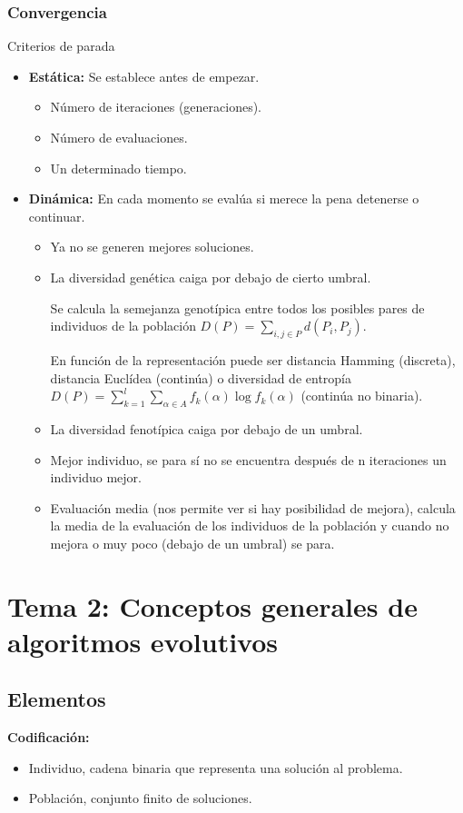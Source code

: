 \documentclass[12pt, twoside, openright]{report} %
\begin{document}
\subsection{Convergencia}
Criterios de parada
\begin{itemize}
	\item \textbf{Estática:} Se establece antes de empezar.
	      \begin{itemize}
		      \item Número de iteraciones (generaciones).
		      \item Número de evaluaciones.
		      \item Un determinado tiempo.
	      \end{itemize}
	\item \textbf{Dinámica:} En cada momento se evalúa si merece la pena detenerse o continuar.
	      \begin{itemize}
		      \item Ya no se generen mejores soluciones.
		      \item La diversidad genética caiga por debajo de cierto umbral.

		            Se calcula la semejanza genotípica entre todos los posibles pares de individuos de la población $D(P)=\sum_{i,j\in P} d(P_i, P_j)$.

		            En función de la representación puede ser distancia Hamming (discreta), distancia Euclídea (continúa) o diversidad de entropía $D(P)=\sum_{k=1}^l\sum_{\alpha \in A} f_k(\alpha)\log f_k(\alpha)$ (continúa no binaria).
		      \item La diversidad fenotípica caiga por debajo de un umbral.
		      \item Mejor individuo, se para sí no se encuentra después de n iteraciones un individuo mejor.
		      \item Evaluación media (nos permite ver si hay posibilidad de mejora), calcula la media de la evaluación de los individuos de la población y cuando no mejora o muy poco (debajo de un umbral) se para.
	      \end{itemize}
\end{itemize}

\chapter{Tema 2: Conceptos generales de algoritmos evolutivos}
\section{Elementos}
\textbf{Codificación:}
\begin{itemize}
	\item Individuo, cadena binaria que representa una solución al problema.
	\item Población, conjunto finito de soluciones.
\end{itemize}
\end{document}

